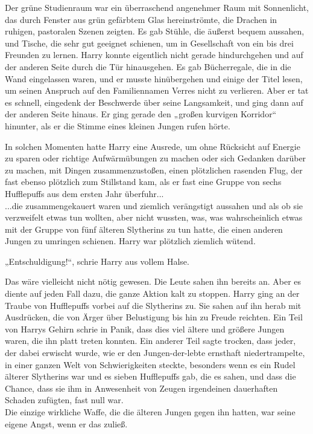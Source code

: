 {Der grüne Studienraum war ein überraschend angenehmer Raum mit Sonnenlicht, das durch Fenster aus grün gefärbtem Glas hereinströmte, die Drachen in ruhigen, pastoralen Szenen zeigten. Es gab Stühle, die äußerst bequem aussahen, und Tische, die sehr gut geeignet schienen, um in Gesellschaft von ein bis drei Freunden zu lernen. Harry konnte eigentlich nicht gerade hindurchgehen und auf der anderen Seite durch die Tür hinausgehen. Es gab Bücherregale, die in die Wand eingelassen waren, und er musste hinübergehen und einige der Titel lesen, um seinen Anspruch auf den Familiennamen Verres nicht zu verlieren. Aber er tat es schnell, eingedenk der Beschwerde über seine Langsamkeit, und ging dann auf der anderen Seite hinaus. Er ging gerade den „großen kurvigen Korridor“ hinunter, als er die Stimme eines kleinen Jungen rufen hörte.

In solchen Momenten hatte Harry eine Ausrede, um ohne Rücksicht auf Energie zu sparen oder richtige Aufwärmübungen zu machen oder sich Gedanken darüber zu machen, mit Dingen zusammenzustoßen, einen plötzlichen rasenden Flug, der fast ebenso plötzlich zum Stillstand kam, als er fast eine Gruppe von sechs Hufflepuffs aus dem ersten Jahr überfuhr...\\ ...die zusammengekauert waren und ziemlich verängstigt aussahen und als ob sie verzweifelt etwas tun wollten, aber nicht wussten, was, was wahrscheinlich etwas mit der Gruppe von fünf älteren Slytherins zu tun hatte, die einen anderen Jungen zu umringen schienen. Harry war plötzlich ziemlich wütend.

„Entschuldigung!“, schrie Harry aus vollem Halse.

Das wäre vielleicht nicht nötig gewesen. Die Leute sahen ihn bereits an. Aber es diente auf jeden Fall dazu, die ganze Aktion kalt zu stoppen. Harry ging an der Traube von Hufflepuffs vorbei auf die Slytherins zu. Sie sahen auf ihn herab mit Ausdrücken, die von Ärger über Belustigung bis hin zu Freude reichten. Ein Teil von Harrys Gehirn schrie in Panik, dass dies viel ältere und größere Jungen waren, die ihn platt treten konnten. Ein anderer Teil sagte trocken, dass jeder, der dabei erwischt wurde, wie er den Jungen-der-lebte ernsthaft niedertrampelte, in einer ganzen Welt von Schwierigkeiten steckte, besonders wenn es ein Rudel älterer Slytherins war und es sieben Hufflepuffs gab, die es sahen, und dass die Chance, dass sie ihm in Anwesenheit von Zeugen irgendeinen dauerhaften Schaden zufügten, fast null war.\\ Die einzige wirkliche Waffe, die die älteren Jungen gegen ihn hatten, war seine eigene Angst, wenn er das zuließ.

}
